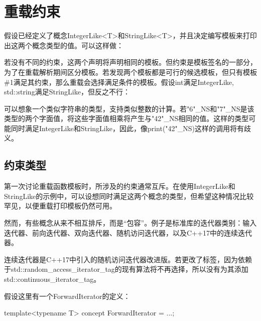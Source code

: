 \section{重载约束}

假设已经定义了概念IntegerLike<T>和StringLike<T>，并且决定编写模板来打印出这两个概念类型的值。可以这样做：


若没有不同的约束，这两个声明将声明相同的模板。但约束是模板签名的一部分，为了在重载解析期间区分模板。若发现两个模板都是可行的候选模板，但只有模板\#1满足其约束，那么重载会选择满足条件的模板。假设int满足IntegerLike, std::string满足StringLike，但反之不行：


可以想象一个类似字符串的类型，支持类似整数的计算。若"6"\_NS和"7"\_NS是该类型的两个字面值，将这些字面值相乘将产生与"42"\_NS相同的值。这样的类型可能同时满足IntegerLike和StringLike，因此，像print("42"\_NS)这样的调用将有歧义。

\subsection{约束类型}

第一次讨论重载函数模板时，所涉及的约束通常互斥。在使用IntegerLike和StringLike的示例中，可以设想同时满足这两个概念的类型，但希望这种情况比较罕见，以便重载打印模板仍然可用。

然而，有些概念从来不相互排斥，而是“包容”。例子是标准库的迭代器类别：输入迭代器、前向迭代器、双向迭代器、随机访问迭代器，以及C++17中的连续迭代器。

\begin{notice}
连续迭代器是C++17中引入的随机访问迭代器改进版。若更改了标签，因为依赖于std::random\_access\_iterator\_tag的现有算法将不再选择，所以没有为其添加std::continuous\_iterator\_tag。
\end{notice}

假设这里有一个ForwardIterator的定义：

\begin{cpp}
template<typename T>
	concept ForwardIterator = ...;
\end{cpp}

